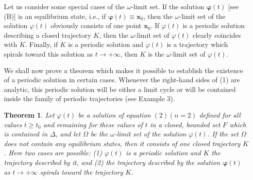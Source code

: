 \documentclass[10pt,a5paper]{book}
\theoremstyle{plain}
\newtheorem{theorem}{Theorem}
\theoremstyle{definition}
\theoremstyle{remark}
\begin{document}
Let us consider some special cases of the $\omega$-limit set. If the solution $\boldsymbol{\varphi}(t)$ [see (B)] is an equilibrium state, i.e., if $\boldsymbol{\varphi}(t) \equiv \mathbf{x}_{0}$, then the $\omega$-limit set of the solution $\varphi(t)$ obviously consists of one point $\mathbf{x}_{0}$. If $\varphi(t)$ is a periodic solution describing a closed trajectory $K$, then the $\omega$-limit set of $\varphi(t)$ clearly coincides with $K$. Finally, if $K$ is a periodic solution and $\varphi(t)$ is a trajectory which spirals toward this solution as $t \rightarrow+\infty$, then $K$ is the $\omega$-limit set of $\varphi(t)$.

We shall now prove a theorem which makes it possible to establish the existence of a periodic solution in certain cases. Whenever the right-hand sides of (1) are analytic, this periodic solution will be either a limit cycle or will be contained inside the family of periodic trajectories (see Example 3).

\begin{theorem}
Let $\varphi(t)$ be a solution of equation $(2)(n=2)$ defined for all values $t \geq t_{0}$ and remaining for these values of $t$ in a closed, bounded set $F$ which is contained in $\Delta$, and let $\Omega$ be the $\omega$-limit set of the solution $\varphi(t)$. If the set $\Omega$ does not contain any equilibrium states, then it consists of one closed trajectory $K$. Here two cases are possible: (1) $\varphi(t)$ is a periodic solution and $K$ the trajectory described by it, and (2) the trajectory described by the solution $\boldsymbol{\varphi}(t)$ as $t \rightarrow+\infty$ spirals toward the trajectory $K$.
\end{theorem}
\end{document}
